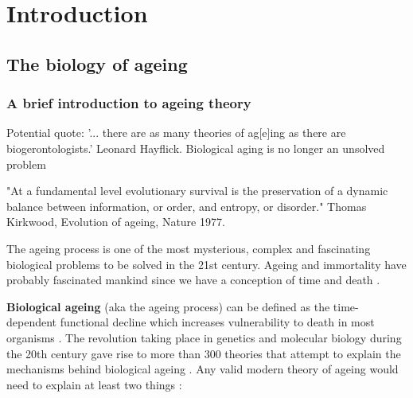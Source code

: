 
\chapter{Introduction}  \label{c:1} %

\ifpdf
    \graphicspath{{Chapter1/Figs/Raster/}{Chapter1/Figs/PDF/}{Chapter1/Figs/}}
\else
    \graphicspath{{Chapter1/Figs/Vector/}{Chapter1/Figs/}}
\fi


\section{The biology of ageing} %

\subsection{A brief introduction to ageing theory}

Potential quote: '... there are as many theories of ag[e]ing as there are biogerontologists.' Leonard Hayflick. Biological aging is no longer an unsolved problem

"At a fundamental level evolutionary survival is the preservation of a dynamic balance between information, or order, and entropy, or disorder." Thomas Kirkwood, Evolution of ageing, Nature 1977.

The ageing process is one of the most mysterious, complex and fascinating biological problems to be solved in the 21st century. Ageing and immortality have probably fascinated mankind since we have a conception of time and death \cite{Renfrew2016}. 

\bigskip

\textbf{Biological ageing} (aka the ageing process) can be defined as the time-dependent functional decline which increases vulnerability to death in most organisms \cite{Lopez-Otin2013}. The revolution taking place in genetics and molecular biology during the 20th century gave rise to more than 300 theories that attempt to explain the mechanisms behind biological ageing \cite{Medvedev1990}. Any valid modern theory of ageing would need to explain at least two things \cite{Medvedev1990}:

